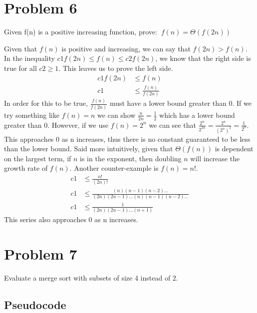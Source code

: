 \documentclass{article}
\begin{document}
\section{Problem 6}
\begin{em}
Given f(n) is a positive increasing function, prove: \(\medspace f(n) = \Theta(f(2n))\) \\
\end{em}
Given that \(f(n)\) is positive and increasing, we can say that \(f(2n) > f(n)\).
In the inequality \(c1 f(2n) \le f(n) \le c2 f(2n)\), we know that the right side is true for all \(c2 \ge 1\).
This leaves us to prove the left side.
\begin{align}
    c1 f(2n) & \le f(n) \\
    c1 & \le \frac{f(n)}{f(2n)}
\end{align}
In order for this to be true, \(\frac{f(n)}{f(2n)}\) must have a lower bound greater than 0.
If we try something like \(f(n) = n\) we can show \(\frac{n}{2n} = \frac{1}{2}\) which has a lower bound greater than 0.
However, if we use \(f(n) = 2^n\) we can see that \(\frac{2^n}{2^{2n}} = \frac{2^n}{({2^n})^2} = \frac{1}{2^n}\).
This approaches 0 as n increases, thus there is no constant guaranteed to be less than the lower bound.
Said more intuitively, given that \(\Theta(f(n))\) is dependent on the largest term, if \(n\) is in the exponent, then doubling \(n\) will increase the growth rate of \(f(n)\).
Another counter-example is \(f(n) = n!\).
\begin{align}
    c1 & \le \frac{n!}{(2n)!} \\
    c1 & \le \frac{(n)(n-1)(n-2)\ldots}{(2n)(2n-1)\ldots(n)(n-1)(n-2)\ldots} \\
    c1 & \le \frac{1}{(2n)(2n-1)\ldots(n+1)}
\end{align}
This series also approaches 0 as n increases.

\section{Problem 7}
\begin{em}
Evaluate a merge sort with subsets of size 4 instead of 2.
\end{em}
\subsection{Pseudocode}

\end{document}
